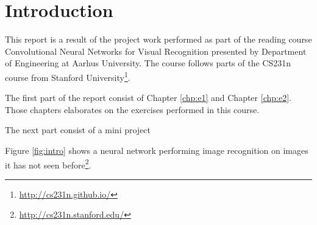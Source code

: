 \chapter{Introduction}
\label{chp:intro}
This report is a result of the project work performed as part of the reading course Convolutional Neural Networks for Visual Recognition presented by Department of Engineering at Aarhus University. The course follows parts of the CS231n course from Stanford University\footnote{\url{http://cs231n.github.io/}}.

The first part of the report consist of Chapter \ref{chp:e1} and Chapter \ref{chp:e2}. Those chapters elaborates on the exercises performed in this course.

The next part consist of a mini project 


Figure \ref{fig:intro} shows a neural network performing image recognition on images it has not seen before\footnote{\url{http://cs231n.stanford.edu/}}.

